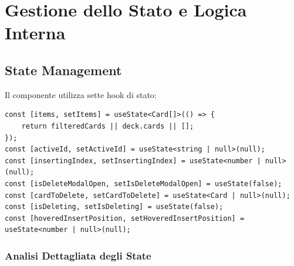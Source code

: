 \documentclass[11pt,a4paper]{article}
\begin{document}
\section{Gestione dello Stato e Logica Interna}

\subsection{State Management}

Il componente utilizza sette hook di stato:

\begin{lstlisting}[style=typescript, caption=State Hooks]
const [items, setItems] = useState<Card[]>(() => {
    return filteredCards || deck.cards || [];
});
const [activeId, setActiveId] = useState<string | null>(null);
const [insertingIndex, setInsertingIndex] = useState<number | null>(null);
const [isDeleteModalOpen, setIsDeleteModalOpen] = useState(false);
const [cardToDelete, setCardToDelete] = useState<Card | null>(null);
const [isDeleting, setIsDeleting] = useState(false);
const [hoveredInsertPosition, setHoveredInsertPosition] = useState<number | null>(null);
\end{lstlisting}

\subsubsection{Analisi Dettagliata degli State}
\end{document}
